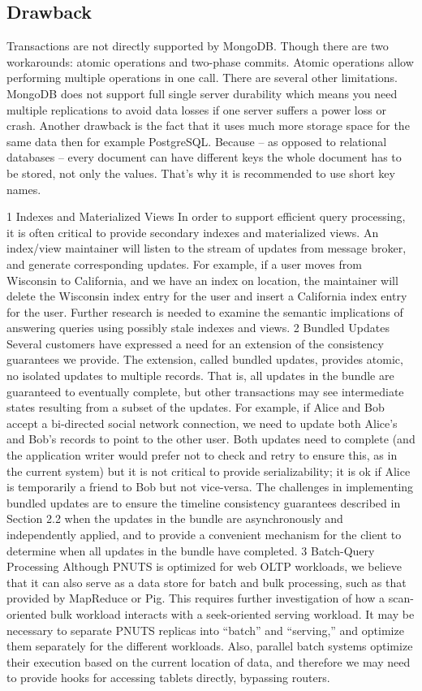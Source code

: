 \documentclass[12pt,letter]{article}
\begin{document}
\subsection{Drawback}
Transactions are not directly supported by MongoDB. Though there are two workarounds: atomic operations and two-phase commits. Atomic operations allow performing multiple operations in one call. 
There are several other limitations. MongoDB does not support full single server durability which means you need multiple replications to avoid data losses if one server suffers a power loss or crash. Another drawback is the fact that it uses much more storage space for the same data then for example PostgreSQL. Because – as opposed to relational databases – every document can have different keys the whole document has to be stored, not only the values. That's why it is recommended to use short key names.

1 Indexes and Materialized Views
In order to support efficient query processing, it is often critical to provide secondary indexes and materialized views. An index/view maintainer will listen to the stream of updates from message broker, and generate corresponding updates. For example, if a user moves from Wisconsin to California, and we have an index on location, the maintainer will delete the Wisconsin index entry for the user and insert a California index entry for the user. Further research is needed to examine the semantic implications of answering queries using possibly stale indexes and views.
2 Bundled Updates
Several customers have expressed a need for an extension of the consistency guarantees we provide. The extension, called bundled updates, provides atomic, no isolated updates to multiple records. That is, all updates in the bundle are guaranteed to eventually complete, but other transactions may see intermediate states resulting from a subset of the updates. For example, if Alice and Bob accept a bi-directed social network connection, we need to update both Alice’s and Bob’s records to point to the other user. Both updates need to complete (and the application writer would prefer not to check and retry to ensure this, as in the current system) but it is not critical to provide serializability; it is ok if Alice is temporarily a friend to Bob but not vice-versa. The challenges in implementing bundled updates are to ensure the timeline consistency guarantees described in Section 2.2 when the updates in the bundle are asynchronously and independently applied, and to provide a convenient mechanism for the client to determine when all updates in the bundle have completed.
3 Batch-Query Processing
Although PNUTS is optimized for web OLTP workloads, we believe that it can also serve as a data store for batch and bulk processing, such as that provided by MapReduce or Pig. This requires further investigation of how a scan-oriented bulk workload interacts with a seek-oriented serving workload. It may be necessary to separate PNUTS replicas into “batch” and “serving,” and optimize them separately for the different workloads. Also, parallel batch systems optimize their execution based on the current location of data, and therefore we may need to provide hooks for accessing tablets directly, bypassing routers.


\end{document}
